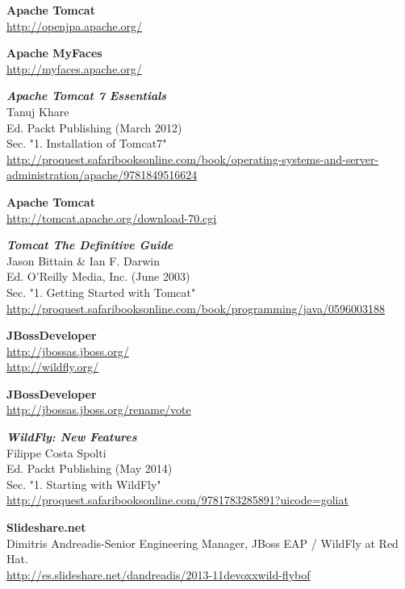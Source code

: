 \documentclass[a4paper, 10pt]{article}
\begin{document}
\begin{thebibliography}{10}
	\textbf{Apache Tomcat}\\
		\url{http://openjpa.apache.org/}

	\textbf{Apache MyFaces}\\
		\url{http://myfaces.apache.org/}

	\textbf{\textit{Apache Tomcat 7 Essentials}}\\
	Tanuj Khare\\
	Ed. Packt Publishing (March 2012)\\
	Sec. "1. Installation of Tomcat7"\\
		\url{http://proquest.safaribooksonline.com/book/operating-systems-and-server-administration/apache/9781849516624}
	
	\textbf{Apache Tomcat}\\
		\url{http://tomcat.apache.org/download-70.cgi}

	\textbf{\textit{Tomcat The Definitive Guide}}\\
	Jason Bittain \& Ian F. Darwin\\
	Ed. O'Reilly Media, Inc. (June 2003)\\
	Sec. "1. Getting Started with Tomcat"\\
		\url{http://proquest.safaribooksonline.com/book/programming/java/0596003188}
	
	\textbf{JBossDeveloper}\\
		\url{http://jbossas.jboss.org/}\\
		\url{http://wildfly.org/}
	
	\textbf{JBossDeveloper}\\
		\url{http://jbossas.jboss.org/rename/vote}
	
	\textbf{\textit{WildFly: New Features}}\\
	Filippe Costa Spolti\\
	Ed. Packt Publishing (May 2014)\\
	Sec. "1. Starting with WildFly"\\
		\url{http://proquest.safaribooksonline.com/9781783285891?uicode=goliat} 

	\textbf{Slideshare.net}\\
	Dimitris Andreadis-Senior Engineering Manager, JBoss EAP / WildFly at Red Hat.\\
		\url{http://es.slideshare.net/dandreadis/2013-11devoxxwild-flybof}


\end{thebibliography}
\end{document}
